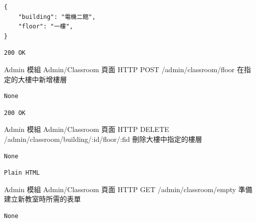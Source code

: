 \documentclass{article}
\begin{document}
\bigskip

\begin{lrbox}{\jsoninputbox}
	\begin{lstlisting}[basicstyle=\tiny\ttfamily]
{
	"building": "電機二館",
	"floor": "一樓",
}
\end{lstlisting}
\end{lrbox}

\begin{lrbox}{\jsonoutputbox}
	\begin{lstlisting}
200 OK
\end{lstlisting}
\end{lrbox}

{Admin 模組}
{Admin/Classroom 頁面}
{HTTP POST}
{/admin/classroom/floor}
{在指定的大樓中新增樓層}

\bigskip

\begin{lrbox}{\jsoninputbox}
	\begin{lstlisting}
None
\end{lstlisting}
\end{lrbox}

\begin{lrbox}{\jsonoutputbox}
	\begin{lstlisting}
200 OK
\end{lstlisting}
\end{lrbox}

{Admin 模組}
{Admin/Classroom 頁面}
{HTTP DELETE}
{/admin/classroom/building/:id/floor/:fid}
{刪除大樓中指定的樓層}

\bigskip

\begin{lrbox}{\jsoninputbox}
	\begin{lstlisting}
None
\end{lstlisting}
\end{lrbox}

\begin{lrbox}{\jsonoutputbox}
	\begin{lstlisting}
Plain HTML
\end{lstlisting}
\end{lrbox}

{Admin 模組}
{Admin/Classroom 頁面}
{HTTP GET}
{/admin/classroom/empty}
{準備建立新教室時所需的表單}

\bigskip

\begin{lrbox}{\jsoninputbox}
	\begin{lstlisting}
None
\end{lstlisting}
\end{lrbox}
\end{document}
